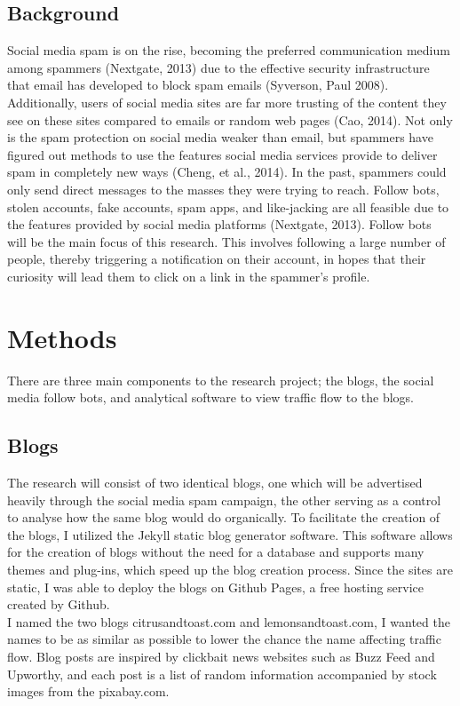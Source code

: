 \documentclass{article}
\begin{document}
\subsection{Background} Social media spam is on the rise, becoming the preferred communication medium among spammers (Nextgate, 2013) due to the effective security infrastructure that email has developed to block spam emails (Syverson, Paul 2008). Additionally, users of social media sites are far more trusting of the content they see on these sites compared to emails or random web pages (Cao, 2014). Not only is the spam protection on social media weaker than email, but spammers have figured out methods to use the features social media services provide to deliver spam in completely new ways (Cheng, et al., 2014). 
In the past, spammers could only send direct messages to the masses they were trying to reach.  Follow bots, stolen accounts, fake accounts, spam apps, and like-jacking are all feasible due to the features provided by social media platforms (Nextgate, 2013). Follow bots will be the main focus of this research. This involves following a large number of people, thereby triggering a notification on their account, in hopes that their curiosity will lead them to click on a link in the spammer’s profile. 

\section{Methods}

There are three main components to the research project; the blogs, the social media follow bots, and analytical software to view traffic flow to the blogs.
\subsection{Blogs}
The research will consist of two identical blogs, one which will be advertised heavily through the social media spam campaign, the other serving as a control to analyse how the same blog would do organically. To facilitate the creation of the blogs, I utilized the Jekyll static blog generator software. This software allows for the creation of blogs without the need for a database and supports many themes and plug-ins, which speed up the blog creation process. Since the sites are static, I was able to deploy the blogs on Github Pages, a free hosting service created by Github. 
\\
I named the two blogs citrusandtoast.com and lemonsandtoast.com, I wanted the names to be as similar as possible to lower the chance the name affecting traffic flow. Blog posts are inspired by clickbait news websites such as Buzz Feed and Upworthy, and each post is a list of random information accompanied by stock images from the pixabay.com. 
\end{document}
